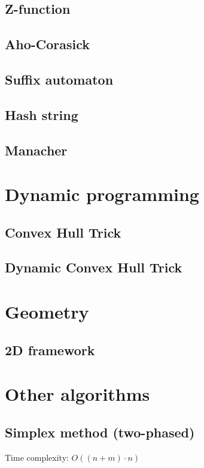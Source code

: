 \documentclass[11pt]{article}
\begin{document}
\subsection{Z-function}

\subsection{Aho-Corasick}

\subsection{Suffix automaton}

\subsection{Hash string}

\subsection{Manacher}


\section{Dynamic programming}
\subsection{Convex Hull Trick}

\subsection{Dynamic Convex Hull Trick}


\section{Geometry}
\subsection{2D framework}


\section{Other algorithms}
\subsection{Simplex method (two-phased)}
Time complexity: $O((n + m) \cdot n)$

\end{document}
